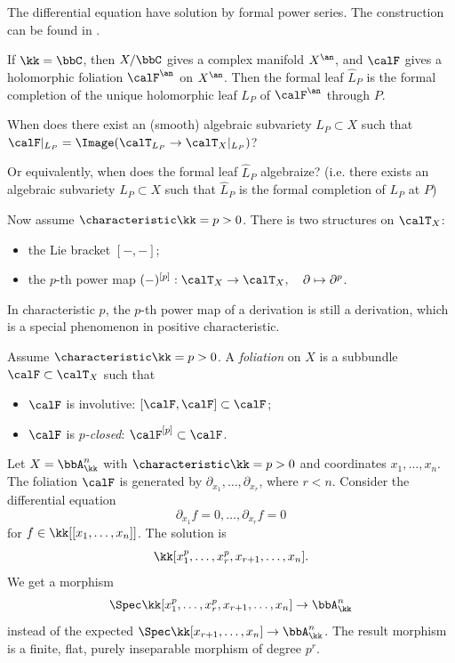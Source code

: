   \begin{remark}
    The differential equation have solution by formal power series.
    The construction can be found in \cite{Bost}.
  \end{remark}

  \begin{remark}
    If $\kk = \bbC$, then $X/\bbC$ gives a complex manifold $X^{\an}$, and $\calF$ gives a holomorphic foliation $\calF^{\an}$ on $X^{\an}$.
    Then the formal leaf $\hat{L}_P$ is the formal completion of the unique holomorphic leaf $L_P$ of $\calF^{\an}$ through $P$.
  \end{remark}

  \begin{question}
    When does there exist an (smooth) algebraic subvariety $L_P \subset X$ such that $\calF|_{L_P} = \Image(\calT_{L_P} \to \calT_X|_{L_P})$?

    Or equivalently, when does the formal leaf $\hat{L}_P$ algebraize? 
    (i.e. there exists an algebraic subvariety $L_P \subset X$ such that $\hat{L}_P$ is the formal completion of $L_P$ at $P$)
  \end{question}

  Now assume $\characteristic \kk = p > 0$.
  There is two structures on $\calT_X$:
  \begin{itemize}
    \item the Lie bracket $[-, -]$;
    \item the $p$-th power map $(-)^{[p]}: \calT_X \to \calT_X, \quad \partial \mapsto \partial^p$.
  \end{itemize}
  In characteristic $p$, the $p$-th power map of a derivation is still a derivation, which is a special phenomenon in positive characteristic.

  \begin{definition}
    Assume $\characteristic \kk = p > 0$.
    A \emph{foliation} on $X$ is a subbundle $\calF \subset \calT_X$ such that
    \begin{itemize}
      \item $\calF$ is involutive: $[\calF, \calF] \subset \calF$;
      \item $\calF$ is \emph{$p$-closed}: $\calF^{[p]} \subset \calF$.
    \end{itemize}
  \end{definition}

  \begin{example}
    Let $X = \bbA^n_\kk$ with $\characteristic \kk = p > 0$ and coordinates $x_1, \dots, x_n$.
    The foliation $\calF$ is generated by $\partial_{x_1}, \dots, \partial_{x_r}$, where $r < n$.
    Consider the differential equation
    \[ \partial_{x_1} f = 0, \dots, \partial_{x_r} f = 0 \]
    for $f \in \kk[[x_1, \dots, x_n]]$.
    The solution is 
    \[ \kk[x_1^p, \dots, x_r^p, x_{r+1}, \dots, x_n]. \]
    We get a morphism 
    \[ \Spec \kk[x_1^p, \dots, x_r^p, x_{r+1}, \dots, x_n] \to \bbA^n_\kk \]
    instead of the expected $\Spec \kk[x_{r+1}, \dots, x_n] \to \bbA^n_\kk$.
    The result morphism is a finite, flat, purely inseparable morphism of degree $p^r$.
  \end{example}

